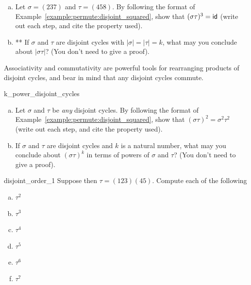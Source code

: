 \begin{exercise}{}
\begin{enumerate}[(a)]
\item
Let $\sigma = (237)$ and $\tau = (458)$. By following the format of Example~\ref{example:permute:disjoint_squared}, show that $(\sigma \tau)^3 = {\sf{i}d} $ (write out each step, and cite the property used).
\item
** If $\sigma$ and $\tau$ are disjoint cycles with $|\sigma| = |\tau| = k$, what may you conclude about $| \sigma \tau |$? (You don't need to give a proof).
\end{enumerate}
\end{exercise}

\noindent
Associativity and commutativity are powerful tools for rearranging products of disjoint cycles, and bear in mind that any disjoint cycles commute.

\begin{exercise}{k_power_disjoint_cycles}
\begin{enumerate}[(a)]
\item
Let $\sigma$ and $\tau$ be \emph{any} disjoint cycles. By following the format of Example~\ref{example:permute:disjoint_squared}, show that $(\sigma \tau)^2 = \sigma^2 \tau^2$ (write out each step, and cite the property used).
\item
If $\sigma$ and $\tau$ are disjoint cycles and $k$ is a natural number, what may you conclude about $(\sigma \tau)^k$ in terms of powers of $\sigma$ and $\tau$? (You don't need to give a proof).
\end{enumerate}
\end{exercise}




\begin{exercise}{disjoint_order_1}
Suppose then $\tau = (1 2 3)( 4 5)$. Compute each of the following
\begin{multicols}{3}
\begin{enumerate}[(a)]
\item 
$\tau^2$
\item 
$\tau^3$
\item 
$\tau^4$
\item 
$\tau^5$
\item 
$\tau^6$
\item
$\tau^7$
\end{enumerate}
\end{multicols}
\end{exercise}

